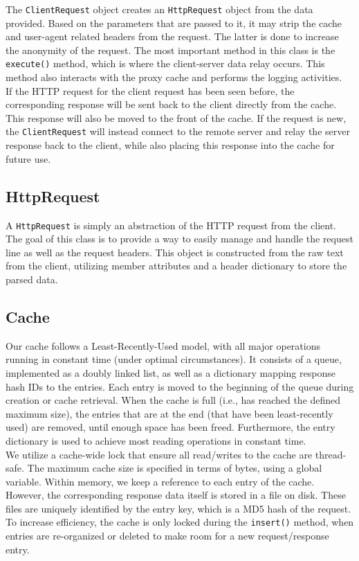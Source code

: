 \documentclass{report}
\begin{document}
The \texttt{ClientRequest} object creates an \texttt{HttpRequest} object from the data provided. Based on the parameters that are passed to it, it may strip the cache and user-agent related headers from the request. The latter is done to increase the anonymity of the request. The most important method in this class is the \texttt{execute()} method, which is where the client-server data relay occurs. This method also interacts with the proxy cache and performs the logging activities.\\

If the HTTP request for the client request has been seen before, the corresponding response will be sent back to the client directly from the cache. This response will also be moved to the front of the cache. If the request is new, the \texttt{ClientRequest} will instead connect to the remote server and relay the server response back to the client, while also placing this response into the cache for future use.

\subsection*{HttpRequest}

A \texttt{HttpRequest} is simply an abstraction of the HTTP request from the client. The goal of this class is to provide a way to easily manage and handle the request line as well as the request headers. This object is constructed from the raw text from the client, utilizing member attributes and a header dictionary to store the parsed data.

\subsection*{Cache}

Our cache follows a Least-Recently-Used model, with all major operations running in constant time (under optimal circumstances). It consists of a queue, implemented as a doubly linked list, as well as a dictionary mapping response hash IDs to the entries. Each entry is moved to the beginning of the queue during creation or cache retrieval. When the cache is full (i.e., has reached the defined maximum size), the entries that are at the end (that have been least-recently used) are removed, until enough space has been freed. Furthermore, the entry dictionary is used to achieve most reading operations in constant time.\\

We utilize a cache-wide lock that ensure all read/writes to the cache are thread-safe. The maximum cache size is specified in terms of bytes, using a global variable. Within memory, we keep a reference to each entry of the cache. However, the corresponding response data itself is stored in a file on disk. These files are uniquely identified by the entry key, which is a MD5 hash of the request. To increase efficiency, the cache is only locked during the \texttt{insert()} method, when entries are re-organized or deleted to make room for a new request/response entry.
\end{document}

